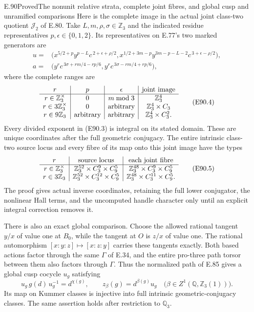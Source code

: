 \begin{statement}{E.90}{Proved}{The nonunit relative strata, complete joint fibres, and global cusp and unramified comparisons}
Here is the complete image in the actual joint
class-two quotient $\mathcal J_2$ of E.80.
Take $L,m,\rho,\sigma\in\mathbb Z_3$ and the indicated
residue representatives $p,\epsilon\in\{0,1,2\}$.
Its representatives on E.77's two marked generators are
\[
\begin{aligned}
 u={}&\bigl(
 x^{5/2+p}y^{p-L}c^{\,2+\epsilon+\rho/2},
 x^{1/2+3m-p}y^{3m-p-L-2}
                         c^{\,3+\epsilon-\rho/2}\bigr),\\
 a={}&\bigl(
 y^r c^{\,3\sigma+r m/4-r p/6},
 y^r c^{\,3\sigma-r m/4+r p/6}\bigr),
\end{aligned}
 \tag{E90.3}
\]
where the complete ranges are
\[
\begin{array}{c|c|c|c}
 r&p&\epsilon&\hbox{joint image}\\ \hline
 r\in\mathbb Z_3^\times&0&m\bmod3&\mathbb Z_3^4\\
 r\in3\mathbb Z_3^\times&0&\text{arbitrary}&\mathbb Z_3^4\times C_3\\
 r\in9\mathbb Z_3&\text{arbitrary}&\text{arbitrary}
       &\mathbb Z_3^4\times C_3^2.
\end{array}
 \tag{E90.4}
\]
Every divided exponent in (E90.3) is integral on
its stated domain. These are unique coordinates
after the full geometric conjugacy. The entire
intrinsic class-two source locus and every fibre
of its map onto this joint image have the types
\[
\begin{array}{c|c|c}
 r&\hbox{source locus}&\hbox{each joint fibre}\\ \hline
 r\in\mathbb Z_3^\times
   &\mathbb Z_3^{52}\times C_3^9\times C_9^5
   &\mathbb Z_3^{48}\times C_3^9\times C_9^5\\
 r\in3\mathbb Z_3
   &\mathbb Z_3^{52}\times C_3^{12}\times C_9^5
   &\mathbb Z_3^{48}\times C_3^{11}\times C_9^5.
\end{array}
 \tag{E90.5}
\]
The proof gives actual inverse coordinates, retaining
the full lower conjugator, the nonlinear Hall terms,
and the uncomputed handle character only until an
explicit integral correction removes it.

There is also an exact global comparison. Choose
the allowed rational tangent $y/x$ of value one
at $B_0$, while the tangent at $O$ is $z/x$ of
value one. The rational automorphism
$[x:y:z]\mapsto[x:z:y]$ carries these tangents
exactly. Both based actions factor through the
same $\Gamma$ of E.34, and the entire pro-three
path torsor between them also factors through
$\Gamma$. Thus the normalized path of E.85
gives a global cusp cocycle $u_g$ satisfying
\[
       u_g\,g(d)\,u_g^{-1}=d^{\chi(g)},\qquad
       z_\beta(g)=d^{\beta(g)}u_g
          \quad\bigl(\beta\in Z^1(\mathbb Q,\mathbb Z_3(1))\bigr).
 \tag{E90.6}
\]
Its map on Kummer classes is injective into full
intrinsic geometric-conjugacy classes. The same
assertion holds after restriction to $\mathbb Q_3$.


\end{statement}
